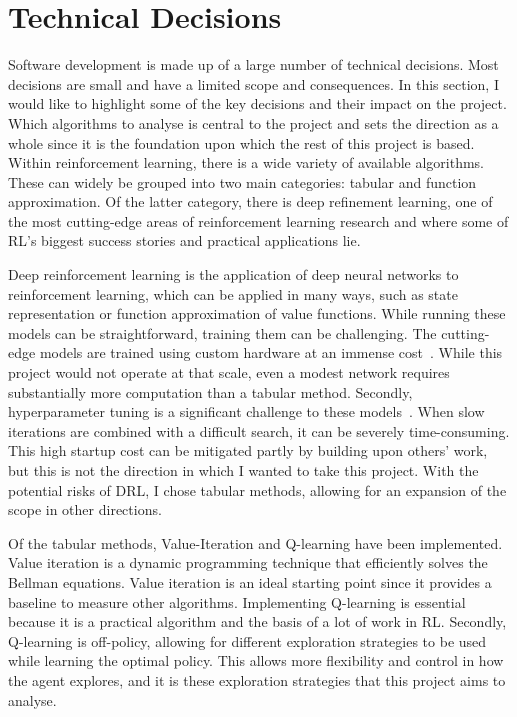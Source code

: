 \documentclass[]{final_report}
\begin{document}
\section{Technical Decisions}\label{section:technical-decsions}

Software development is made up of a large number of technical decisions. Most decisions are small and have a limited scope and consequences. In this section, I would like to highlight some of the key decisions and their impact on the project. Which algorithms to analyse is central to the project and sets the direction as a whole since it is the foundation upon which the rest of this project is based. Within reinforcement learning, there is a wide variety of available algorithms. These can widely be grouped into two main categories: tabular and function approximation. Of the latter category, there is deep refinement learning, one of the most cutting-edge areas of reinforcement learning research and where some of RL's biggest success stories and practical applications lie. 

Deep reinforcement learning is the application of deep neural networks to reinforcement learning, which can be applied in many ways, such as state representation or function approximation of value functions. While running these models can be straightforward, training them can be challenging. The cutting-edge models are trained using custom hardware at an immense cost~\cite{DeepRLCost}. While this project would not operate at that scale, even a modest network requires substantially more computation than a tabular method. Secondly, hyperparameter tuning is a significant challenge to these models~\cite{deepRLChallanges}. When slow iterations are combined with a difficult search, it can be severely time-consuming. This high startup cost can be mitigated partly by building upon others' work, but this is not the direction in which I wanted to take this project. With the potential risks of DRL, I chose tabular methods, allowing for an expansion of the scope in other directions.

Of the tabular methods, Value-Iteration and Q-learning have been implemented. Value iteration is a dynamic programming technique that efficiently solves the Bellman equations. Value iteration is an ideal starting point since it provides a baseline to measure other algorithms. Implementing Q-learning is essential because it is a practical algorithm and the basis of a lot of work in RL. Secondly, Q-learning is off-policy, allowing for different exploration strategies to be used while learning the optimal policy. This allows more flexibility and control in how the agent explores, and it is these exploration strategies that this project aims to analyse.  
\end{document}
